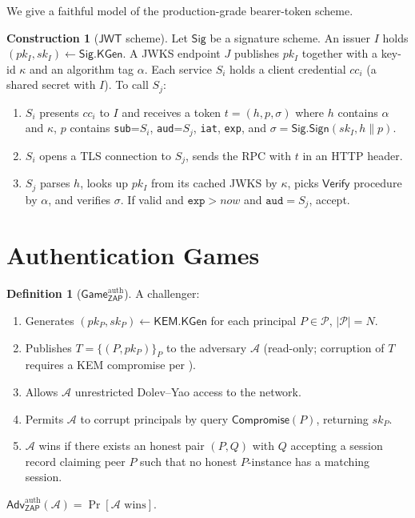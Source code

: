 \documentclass[11pt,a4paper]{article}
\theoremstyle{plain}
\theoremstyle{definition}
\newtheorem{definition}[theorem]{Definition}
\newtheorem{construction}[theorem]{Construction}
\newcommand{\Adv}{\mathsf{Adv}}
\newcommand{\GameG}{\mathsf{Game}}
\newcommand{\KEM}{\mathsf{KEM}}
\newcommand{\JWT}{\mathsf{JWT}}
\newcommand{\ZAP}{\mathsf{ZAP}}
\newcommand{\Sig}{\mathsf{Sig}}
\newcommand{\Verify}{\mathsf{Verify}}
\newcommand{\KeyGen}{\mathsf{KGen}}
\newcommand{\Sign}{\mathsf{Sign}}
\begin{document}
We give a faithful model of the production-grade bearer-token scheme.

\begin{construction}[$\JWT$ scheme]
\label{con:jwt}
Let $\Sig$ be a signature scheme. An issuer $I$ holds $(pk_I, sk_I) \gets
\Sig.\KeyGen$. A JWKS endpoint $J$ publishes $pk_I$ together with a
key-id $\kappa$ and an algorithm tag $\alpha$. Each service $S_i$ holds a
client credential $cc_i$ (a shared secret with $I$). To call $S_j$:
\begin{enumerate}[itemsep=2pt,topsep=2pt]
  \item $S_i$ presents $cc_i$ to $I$ and receives a token
        $t = (h, p, \sigma)$ where $h$ contains $\alpha$ and $\kappa$, $p$
        contains \texttt{sub}=$S_i$, \texttt{aud}=$S_j$, \texttt{iat},
        \texttt{exp}, and $\sigma = \Sig.\Sign(sk_I, h \| p)$.
  \item $S_i$ opens a TLS connection to $S_j$, sends the RPC with $t$ in
        an HTTP header.
  \item $S_j$ parses $h$, looks up $pk_I$ from its cached JWKS by
        $\kappa$, picks $\Verify$ procedure by $\alpha$, and verifies
        $\sigma$. If valid and $\texttt{exp} > \mathit{now}$ and
        $\texttt{aud} = S_j$, accept.
\end{enumerate}
\end{construction}

\section{Authentication Games}
\label{sec:games}

\begin{definition}[$\GameG_\ZAP^{\text{auth}}$]
\label{def:gamezap}
A challenger:
\begin{enumerate}[itemsep=2pt,topsep=2pt]
  \item Generates $(pk_P, sk_P) \gets \KEM.\KeyGen$ for each principal
        $P \in \mathcal{P}$, $|\mathcal{P}|=N$.
  \item Publishes $T = \{(P, pk_P)\}_P$ to the adversary $\mathcal{A}$
        (read-only; corruption of $T$ requires a KEM compromise per
        ).
  \item Allows $\mathcal{A}$ unrestricted Dolev--Yao access to the network.
  \item Permits $\mathcal{A}$ to corrupt principals by query
        $\mathsf{Compromise}(P)$, returning $sk_P$.
  \item $\mathcal{A}$ wins if there exists an honest pair $(P, Q)$ with
        $Q$ accepting a session record claiming peer $P$ such that no
        honest $P$-instance has a matching session.
\end{enumerate}
$\Adv_\ZAP^{\text{auth}}(\mathcal{A}) = \Pr[\mathcal{A} \text{ wins}]$.
\end{definition}
\end{document}
